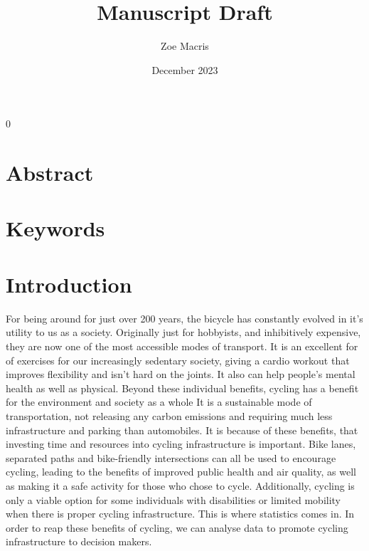 \documentclass[12pt, letterpaper]{article}
\newcommand{\blind}{0}
\begin{document}

\blind
{
  \title{\bf Manuscript Draft}
  \author{Zoe Macris}
\date{December 2023}
  \maketitle} 


\section{Abstract}
\label{sec:abstract}



\section{Keywords}
\label{sec:keywords}


\section{Introduction}
\label{sec:intro}

For being around for just over 200 years, the bicycle has constantly evolved in it's utility to us as a society. Originally just for hobbyists, and inhibitively expensive, they are now one of the most accessible modes of transport. It is an excellent for of exercises for our increasingly sedentary society, giving a cardio workout that improves flexibility and isn't hard on the joints. It also can help people's mental health as well as physical. Beyond these individual benefits, cycling has a benefit for the environment and society as a whole It is a sustainable mode of transportation, not releasing any carbon emissions and requiring much less infrastructure and parking than automobiles. It is because of these benefits, that investing time and resources into cycling infrastructure is important. Bike lanes, separated paths and bike-friendly intersections can all be used to encourage cycling, leading to the benefits of improved public health and air quality, as well as making it a safe activity for those who chose to cycle. Additionally, cycling is only a viable option for some individuals with disabilities or limited mobility when there is proper cycling infrastructure. This is where statistics comes in. In order to reap these benefits of cycling, we can analyse data to promote cycling infrastructure to decision makers. 
\end{document}
